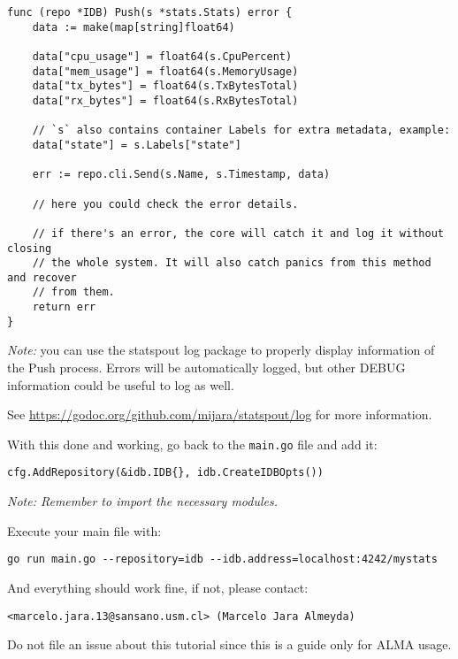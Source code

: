 \begin{lstlisting}[language=Golang]
func (repo *IDB) Push(s *stats.Stats) error {
    data := make(map[string]float64)

    data["cpu_usage"] = float64(s.CpuPercent)
    data["mem_usage"] = float64(s.MemoryUsage)
    data["tx_bytes"] = float64(s.TxBytesTotal)
    data["rx_bytes"] = float64(s.RxBytesTotal)

    // `s` also contains container Labels for extra metadata, example:
    data["state"] = s.Labels["state"]

    err := repo.cli.Send(s.Name, s.Timestamp, data)

    // here you could check the error details.

    // if there's an error, the core will catch it and log it without closing
    // the whole system. It will also catch panics from this method and recover
    // from them.
	return err
}
\end{lstlisting}

\textit{Note:} you can use the statspout log package to properly display information of the Push process. Errors will be automatically logged, but other DEBUG information could be useful to log as well.

See \url{https://godoc.org/github.com/mijara/statspout/log} for more information.

With this done and working, go back to the \texttt{main.go} file and add it:

\begin{lstlisting}[language=Golang]
cfg.AddRepository(&idb.IDB{}, idb.CreateIDBOpts())
\end{lstlisting}

\textit{Note: Remember to import the necessary modules.}

Execute your main file with:

\begin{lstlisting}
go run main.go --repository=idb --idb.address=localhost:4242/mystats
\end{lstlisting}

And everything should work fine, if not, please contact:

\begin{center}
\texttt{<marcelo.jara.13@sansano.usm.cl> (Marcelo Jara Almeyda)}
\end{center}

Do not file an issue about this tutorial since this is a guide only for ALMA usage.
